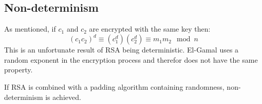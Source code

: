 \subsection{Non-determinism}
As mentioned, if $c_1$ and $c_2$ are encrypted with the same key then:
\begin{equation}
  (c_1c_2)^d \equiv (c_1^d) (c_2^d) \equiv m_1m_2 \mod n
\end{equation}
This is an unfortunate result of RSA being deterministic. El-Gamal
uses a random exponent in the encryption process and therefor does not
have the same property.

If RSA is combined with a padding algorithm containing randomness,
non-determinism is achieved.
